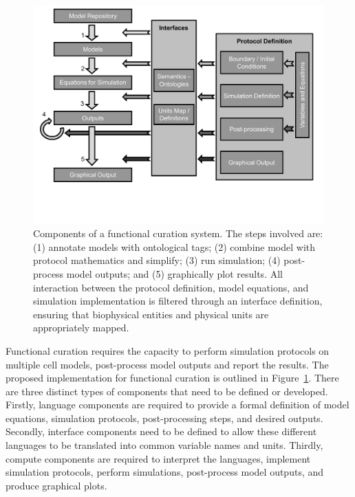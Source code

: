 \documentclass[preprint,authoryear,12pt]{elsarticle}
\begin{document}
\begin{figure}
\begin{center} %
\includegraphics[trim = 4mm 28mm 8mm 0mm, clip, width=\linewidth]{schematic_v4}
\caption{Components of a functional curation system.
The steps involved are:
(1) annotate models with ontological tags;
(2) combine model with protocol mathematics and simplify;
(3) run simulation;
(4) post-process model outputs; and
(5) graphically plot results.
All interaction between the protocol definition, model equations, and simulation implementation is filtered through an interface definition, ensuring that biophysical entities and physical units are appropriately mapped.}
\label{fig:schematic}
\end{center}
\end{figure}

Functional curation requires the capacity to perform simulation protocols on multiple cell models, post-process model outputs and report the results.
The proposed implementation for functional curation is outlined in Figure~\ref{fig:schematic}.
There are three distinct types of components that need to be defined or developed.
Firstly, language components are required to provide a formal definition of model equations, simulation protocols, post-processing steps, and desired outputs.
Secondly, interface components need to be defined to allow these different languages to be translated into common variable names and units. 
Thirdly, compute components are required to interpret the languages, implement simulation protocols, perform simulations, post-process model outputs, and produce graphical plots.
\end{document}

